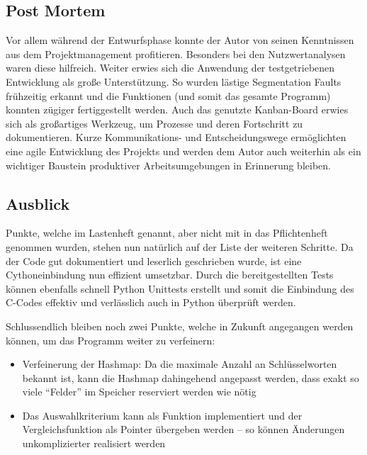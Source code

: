 \subsection{Post Mortem}

Vor allem während der Entwurfsphase konnte der Autor von seinen Kenntnissen aus dem Projektmanagement profitieren.
Besonders bei den Nutzwertanalysen waren diese hilfreich. Weiter erwies sich die Anwendung der
testgetriebenen Entwicklung als große Unterstützung. So wurden lästige Segmentation Faults frühzeitig erkannt und die Funktionen (und somit das gesamte Programm) konnten zügiger fertiggestellt werden.
Auch das genutzte Kanban-Board erwies sich als großartiges Werkzeug, um Prozesse und deren Fortschritt zu dokumentieren.
Kurze Kommunikations- und Entscheidungswege ermöglichten eine agile Entwicklung des Projekts und werden
dem Autor auch weiterhin als ein wichtiger Baustein produktiver Arbeitsumgebungen in Erinnerung bleiben.

\subsection{Ausblick}
Punkte, welche im Lastenheft genannt, aber nicht mit in das Pflichtenheft genommen wurden,
stehen nun natürlich auf der Liste der weiteren Schritte. Da der Code gut dokumentiert
und leserlich geschrieben wurde, ist eine Cythoneinbindung nun effizient umsetzbar.
Durch die bereitgestellten Tests können ebenfalls schnell Python Unittests erstellt und somit
die Einbindung des C-Codes effektiv und verlässlich auch in Python überprüft werden.

Schlussendlich bleiben noch zwei Punkte, welche in Zukunft angegangen werden können, um das Programm weiter zu verfeinern:

\begin{itemize}
    \item Verfeinerung der Hashmap: Da die maximale Anzahl an Schlüsselworten bekannt ist, kann die Hashmap dahingehend angepasst werden, dass exakt so viele "`Felder"' im Speicher reserviert werden wie nötig
    \item Das Auswahlkriterium kann als Funktion implementiert und der Vergleichsfunktion als Pointer übergeben werden -- so können Änderungen unkomplizierter realisiert werden
\end{itemize}




